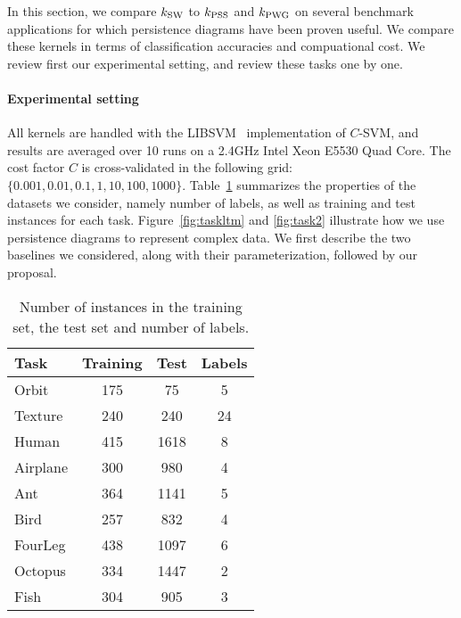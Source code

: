 \documentclass[11pt]{article}
\newcommand{\kPSS}{k_{\rm PSS}}
\newcommand{\kPWG}{k_{\rm PWG}}
\newcommand{\kSW}{k_{\rm SW}}
\begin{document}
In this section, we compare $\kSW$ to $\kPSS$ and $\kPWG$ on 
several benchmark applications for which persistence diagrams have been proven useful. We compare these kernels in terms of classification 
accuracies and compuational cost. We review first our experimental setting, and review these tasks one by one.

\paragraph*{Experimental setting}
 All kernels are handled with the LIBSVM~\cite{Chang01} implementation of $C$-SVM, and results are averaged over 10 runs
on a 2.4GHz Intel Xeon E5530 Quad Core.
The cost factor $C$ is cross-validated in the following grid: $\{0.001, 0.01,0.1, 1,10,100,1000\}$.
Table~\ref{table:sum} summarizes the properties of the datasets we consider, namely number of labels, as well as training and test instances 
for each task. Figure~\ref{fig:taskltm} and \ref{fig:task2} illustrate how we use persistence diagrams to represent complex data.
We first describe the two baselines we considered, along with their parameterization, followed by our proposal.

\begin{table}[t]
\vskip 0.15in
\begin{center}
\begin{small}
\begin{sc}
\begin{tabular}{|l|c|c|c|}
\hline
 Task &        Training &                               Test &                       Labels \\
\hline
Orbit &        175 &                                    75 &                         5  \\
Texture &      240 &                                    240 &                        24  \\
Human &        415 &                                    1618 &                       8 \\
Airplane &     300 &                                    980 &                        4 \\
Ant &          364 &                                    1141 &                       5 \\
Bird &         257 &                                    832 &                        4 \\
FourLeg &      438 &                                    1097 &                       6 \\
Octopus &      334 &                                    1447 &                       2 \\
Fish &         304 &                                    905 &                        3 \\
\hline          
\end{tabular}
\end{sc}
\end{small}
\caption{\label{table:sum} Number of instances in the training set, the test set and number of labels.}
\end{center}
\vskip -0.1in
\end{table}
\end{document}
